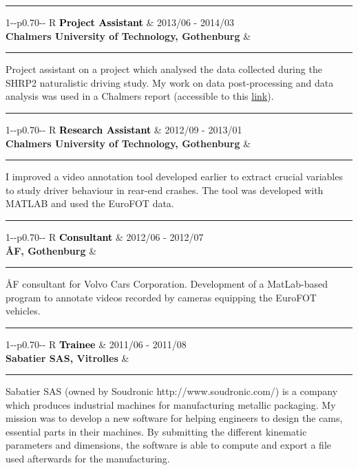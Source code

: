 \documentclass[10pt,A4]{article}
\newcommand{\mpwidth}{\linewidth-\fboxsep-\fboxsep}
\newcommand{\cvevent}[4]
{
\vspace{8pt}
	\begin{tabularx}{1\mpwidth}{p{0.70\mpwidth}  R}
	 \textcolor{black}{\textbf{#2}} & \textcolor{bgcol}{#1} \\
	 \textcolor{complcol}{\textbf{#3}} &
	\end{tabularx}
\vspace{2pt}
\textcolor{softcol}{\hrule}
\vspace{2pt}
\begin{center}
\parbox{.95\mpwidth}{
#4
}
\end{center}
}
\begin{document}
{\begin{minipage}[c][0.98\textheight][t]{0.69\linewidth}
\textcolor{softcol}{\hrule}

\cvevent{2013/06 - 2014/03}{Project Assistant}{Chalmers University of Technology, Gothenburg}{Project assistant on a project which analysed the data collected during the SHRP2 naturalistic driving study. My work on data post-processing and data analysis was used in a Chalmers report (accessible to this \textcolor{complcol}{\href{http://www.trb.org/Publications/Blurbs/171327.aspx}{link}}).}

\textcolor{softcol}{\hrule}

\cvevent{2012/09 - 2013/01}{Research Assistant}{Chalmers University of Technology, Gothenburg}{I improved a video annotation tool developed earlier to extract crucial variables to study driver behaviour in rear-end crashes. The tool was developed with MATLAB and used the EuroFOT data.}

\textcolor{softcol}{\hrule}

\cvevent{2012/06 - 2012/07}{Consultant}{ÅF, Gothenburg}{ÅF consultant for Volvo Cars Corporation. Development of a MatLab-based program to annotate videos recorded by cameras equipping the EuroFOT vehicles. }

\textcolor{softcol}{\hrule}

\cvevent{2011/06 - 2011/08}{Trainee}{Sabatier SAS, Vitrolles}{
	Sabatier SAS (owned by Soudronic http://www.soudronic.com/) is a company which produces industrial machines for manufacturing metallic packaging. My mission was to develop a new software for helping engineers to design the cams, essential parts in their machines. By submitting the different kinematic parameters and dimensions, the software is able to compute and export a file used afterwards for the manufacturing.}


\end{minipage}}%
\end{document}
